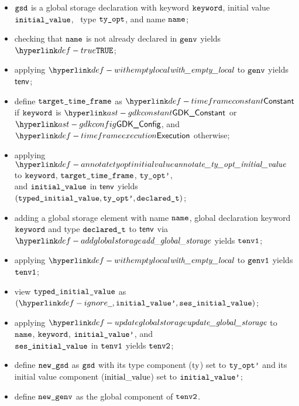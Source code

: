 \ProseParagraph
\AllApply
\begin{itemize}
  \item $\texttt{gsd}$ is a global storage declaration with keyword $\texttt{keyword}$, initial value \\ $\texttt{initial\_value}$,
        \optional\ type $\texttt{ty\_opt}$, and name $\texttt{name}$;
  \item checking that $\texttt{name}$ is not already declared in $\texttt{genv}$ yields $\True$\ProseOrTypeError;
  \item applying $\withemptylocal$ to $\texttt{genv}$ yields $\textsf{tenv}$;
  \item define $\texttt{target\_time\_frame}$ as $\timeframeconstant$ if $\texttt{keyword}$ is $\GDKConstant$ or $\GDKConfig$, and $\timeframeexecution$ otherwise;
  \item applying $\annotatetyoptinitialvalue$ to $\texttt{keyword}$, $\texttt{target\_time\_frame}$, $\texttt{ty\_opt'}$, \\
        and $\texttt{initial\_value}$ in $\textsf{tenv}$ yields\\
        $(\texttt{typed\_initial\_value}, \texttt{ty\_opt'}, \texttt{declared\_t})$\ProseOrTypeError;
  \item adding a global storage element with name $\texttt{name}$, global declaration keyword \\ $\texttt{keyword}$ and type $\texttt{declared\_t}$
        to $\textsf{tenv}$ via $\addglobalstorage$ yields $\texttt{tenv1}$\ProseOrTypeError;
  \item applying $\withemptylocal$ to $\texttt{genv1}$ yields $\texttt{tenv1}$;
  \item view $\texttt{typed\_initial\_value}$ as $(\Ignore, \initialvaluep, \vsesinitialvalue)$;
  \item applying $\updateglobalstorage$ to $\texttt{name}$, $\texttt{keyword}$, $\texttt{initial\_value'}$, and \\
        $\texttt{ses\_initial\_value}$ in $\texttt{tenv1}$ yields $\texttt{tenv2}$\ProseOrTypeError;
  \item define $\texttt{new\_gsd}$ as $\texttt{gsd}$ with its type component ($\text{ty}$) set to $\texttt{ty\_opt'}$ and its initial value component
        ($\text{initial\_value}$) set to $\texttt{initial\_value'}$;
  \item define $\texttt{new\_genv}$ as the global component of $\texttt{tenv2}$.
\end{itemize}

